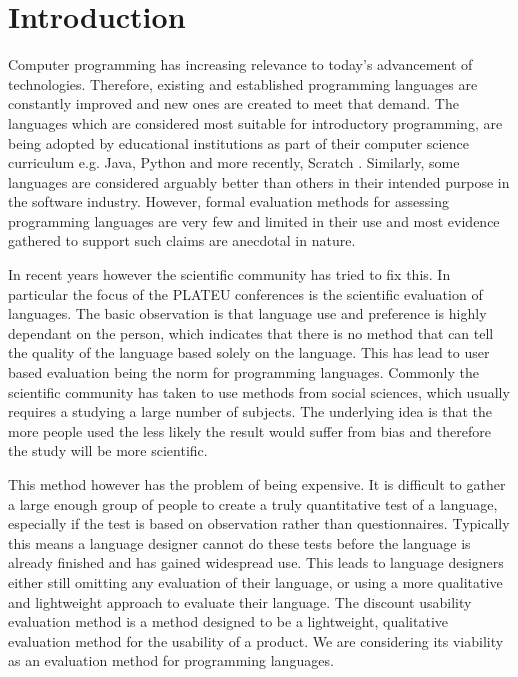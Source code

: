 \chapter{Introduction}
\label{chap:introduction}

Computer programming has increasing relevance to today's advancement of technologies. Therefore, existing and established programming languages are constantly improved and new ones are created to meet that demand. The languages which are considered most suitable for introductory programming, are being adopted by educational institutions as part of their computer science curriculum e.g. Java, Python and more recently, Scratch  . Similarly, some languages are considered arguably better than others in their intended purpose in the software industry. However, formal evaluation methods for assessing programming languages are very few and limited in their use and most evidence gathered to support such claims are anecdotal in nature. 

In recent years however the scientific community has tried to fix this.
In particular the focus of the PLATEU conferences is the scientific evaluation of languages.
The basic observation is that language use and preference is highly dependant on the person, which indicates that there is no method that can tell the quality of the language based solely on the language.
This has lead to user based evaluation being the norm for programming languages.
Commonly the scientific community has taken to use methods from social sciences, which usually requires a studying a large number of subjects.
The underlying idea is that the more people used the less likely the result would suffer from bias and therefore the study will be more scientific.

This method however has the problem of being expensive.
It is difficult to gather a large enough group of people to create a truly quantitative test of a language, especially if the test is based on observation rather than questionnaires.
Typically this means a language designer cannot do these tests before the language is already finished and has gained widespread use.
This leads to language designers either still omitting any evaluation of their language, or using a more qualitative and lightweight approach to evaluate their language.
The discount usability evaluation method is a method designed to be a lightweight, qualitative evaluation method for the usability of a product.
We are considering its viability as an evaluation method for programming languages.

